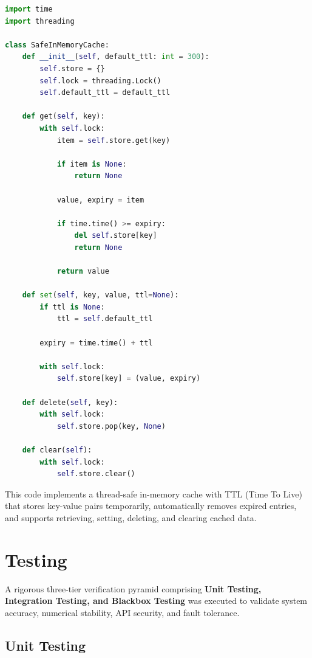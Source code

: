 \begin{lstlisting}[language=Python]
import time
import threading

class SafeInMemoryCache:
    def __init__(self, default_ttl: int = 300):
        self.store = {}
        self.lock = threading.Lock()
        self.default_ttl = default_ttl

    def get(self, key):
        with self.lock:
            item = self.store.get(key)

            if item is None:
                return None

            value, expiry = item

            if time.time() >= expiry:
                del self.store[key]
                return None

            return value

    def set(self, key, value, ttl=None):
        if ttl is None:
            ttl = self.default_ttl

        expiry = time.time() + ttl

        with self.lock:
            self.store[key] = (value, expiry)

    def delete(self, key):
        with self.lock:
            self.store.pop(key, None)

    def clear(self):
        with self.lock:
            self.store.clear()
\end{lstlisting}
\vspace{25p}
This code implements a thread-safe in-memory cache with TTL (Time To Live) that stores key-value pairs temporarily, automatically removes expired entries, and supports retrieving, setting, deleting, and clearing cached data.

\clearpage

\section{Testing}

A rigorous three-tier verification pyramid comprising
\textbf{Unit Testing, Integration Testing, and Blackbox Testing} was
executed to validate system accuracy, numerical stability, API security,
and fault tolerance.


\subsection{Unit Testing}

